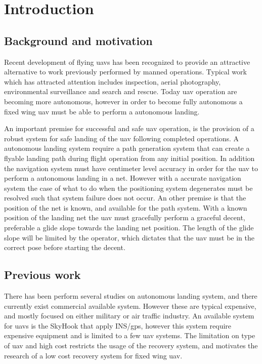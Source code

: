 \chapter{Introduction}
\section{Background and motivation}
Recent development of flying \glspl{uav} has been recognized to provide an attractive alternative to work previously performed by manned operations. Typical work which has attracted attention includes inspection, aerial photography, environmental surveillance and search and rescue. Today \gls{uav} operation are becoming more autonomous, however in order to become fully autonomous a fixed wing \gls{uav} must be able to perform a autonomous landing.

An important premise for successful and safe \gls{uav} operation, is the provision of a robust system for safe landing of the \gls{uav} following completed operations. A autonomous landing system require a path generation system that can create a flyable landing path during flight operation from any initial position. In addition the navigation system must have centimeter level accuracy in order for the \gls{uav} to perform a autonomous landing in a net. However with a accurate navigation system the case of what to do when the positioning system degenerates must be resolved such that system failure does not occur. An other premise is that the position of the net is known, and available for the path system. With a known position of the landing net the \gls{uav} must gracefully perform a graceful decent, preferable a glide slope towards the landing net position. The length of the glide slope will be limited by the operator, which dictates that the \gls{uav} must be in the correct pose before starting the decent.
\section{Previous work}
There has been perform several studies on autonomous landing system, and there currently exist commercial available system. However these are typical expensive, and mostly focused on either military or air traffic industry. An available system for \glspl{uav} is the SkyHook that apply INS/\gls{gps}\citep{SkyHook}, however this system require expensive equipment and is limited to a few \gls{uav} systems. The limitation on type of \gls{uav} and high cost restricts the usage of the recovery system, and motivates the research of a low cost recovery system for fixed wing \gls{uav}.

